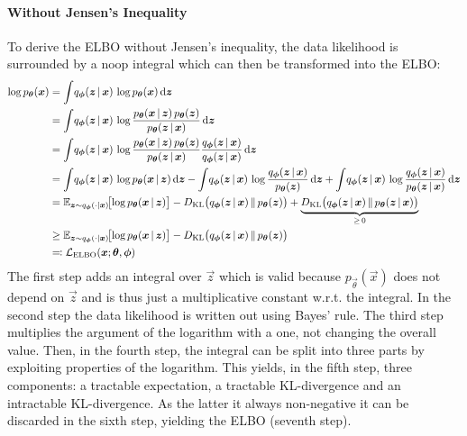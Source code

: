 				\paragraph{Without Jensen's Inequality}
					To derive the ELBO without Jensen's inequality, the data likelihood is surrounded by a noop integral which can then be transformed into the ELBO:
					\begin{align}
						\log p_{\vec{\theta}}(\vec{x})
							&= \int\! q_{\vec{\phi}}(\vec{z} \given \vec{x}) \, \log p_{\vec{\theta}}(\vec{x}) \dd{\vec{z}} \\
							&= \int\! q_{\vec{\phi}}(\vec{z} \given \vec{x}) \, \log \frac{p_{\vec{\theta}}(\vec{x} \given \vec{z}) \, p_{\vec{\theta}}(\vec{z})}{p_{\vec{\theta}}(\vec{z} \given \vec{x})} \dd{\vec{z}} \\
							&= \int\! q_{\vec{\phi}}(\vec{z} \given \vec{x}) \, \log \frac{p_{\vec{\theta}}(\vec{x} \given \vec{z}) \, p_{\vec{\theta}}(\vec{z})}{p_{\vec{\theta}}(\vec{z} \given \vec{x})} \frac{q_{\vec{\phi}}(\vec{z} \given \vec{x})}{q_{\vec{\phi}}(\vec{z} \given \vec{x})} \dd{\vec{z}} \\
							&= \int\! q_{\vec{\phi}}(\vec{z} \given \vec{x}) \, \log p_{\vec{\theta}}(\vec{x} \given \vec{z}) \dd{\vec{z}} - \int\! q_{\vec{\phi}}(\vec{z} \given \vec{x}) \, \log \frac{q_{\vec{\phi}}(\vec{z} \given \vec{x})}{p_{\vec{\theta}}(\vec{z})} \dd{\vec{z}} + \int\! q_{\vec{\phi}}(\vec{z} \given \vec{x}) \, \log \frac{q_{\vec{\phi}}(\vec{z} \given \vec{x})}{p_{\vec{\theta}}(\vec{z} \given \vec{x})} \dd{\vec{z}} \\
							&= \E_{\vec{z} \sim q_{\vec{\phi}}(\cdot \subgiven \vec{x})}\!\big[\! \log p_{\vec{\theta}}(\vec{x} \given \vec{z}) \big] - D_\mathrm{KL}\big( q_{\vec{\phi}}(\vec{z} \given \vec{x}) \,\Vert\, p_{\vec{\theta}}(\vec{z}) \big) + \underbrace{D_\mathrm{KL}\big( q_{\vec{\phi}}(\vec{z} \given \vec{x}) \,\Vert\, p_{\vec{\theta}}(\vec{z} \given \vec{x}) \big)}_{\geq\, 0} \\
							&\geq \E_{\vec{z} \sim q_{\vec{\phi}}(\cdot \subgiven \vec{x})}\!\big[\! \log p_{\vec{\theta}}(\vec{x} \given \vec{z}) \big] - D_\mathrm{KL}\big( q_{\vec{\phi}}(\vec{z} \given \vec{x}) \,\Vert\, p_{\vec{\theta}}(\vec{z}) \big) \\
							&\eqqcolon \mathcal{L}_\mathrm{ELBO}(\vec{x}; \vec{\theta}, \vec{\phi})
					\end{align}
					The first step adds an integral over \(\vec{z}\) which is valid because \( p_{\vec{\theta}}(\vec{x}) \) does not depend on \(\vec{z}\) and is thus just a multiplicative constant w.r.t. the integral. In the second step the data likelihood is written out using Bayes' rule. The third step multiplies the argument of the logarithm with a one, not changing the overall value. Then, in the fourth step, the integral can be split into three parts by exploiting properties of the logarithm. This yields, in the fifth step, three components: a tractable expectation, a tractable KL-divergence and an intractable KL-divergence. As the latter it always non-negative it can be discarded in the sixth step, yielding the ELBO (seventh step).

